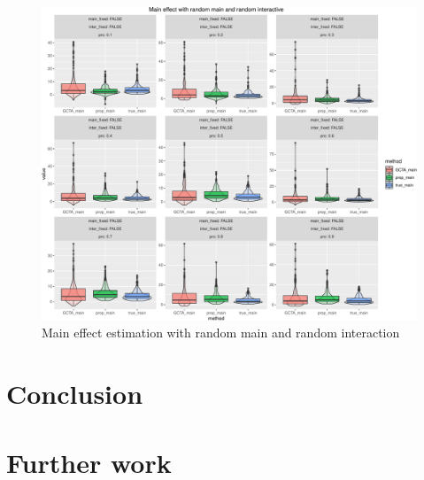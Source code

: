 \documentclass[]{article}
\begin{document}
\begin{figure}
\centering
\includegraphics{Simulation_report_files/figure-latex/main effect random random-1.pdf}
\caption{Main effect estimation with random main and random interaction}
\end{figure}

\section{Conclusion}\label{conclusion}

\section{Further work}\label{further-work}
\end{document}
